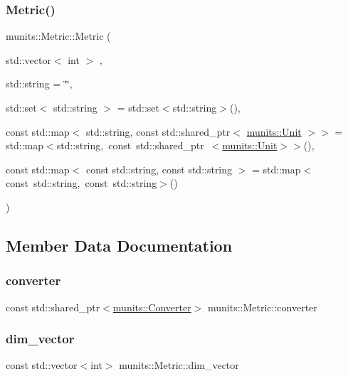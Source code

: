 \subsubsection{\texorpdfstring{Metric()}{Metric()}}
{\footnotesize\ttfamily munits\+::\+Metric\+::\+Metric (\begin{DoxyParamCaption}\item[{std\+::vector$<$ int $>$}]{,  }\item[{std\+::string}]{ = {\ttfamily \char`\"{}\char`\"{}},  }\item[{std\+::set$<$ std\+::string $>$}]{ = {\ttfamily std\+:\+:set$<$std\+:\+:string$>$()},  }\item[{const std\+::map$<$ std\+::string, const std\+::shared\+\_\+ptr$<$ \hyperlink{classmunits_1_1_unit}{munits\+::\+Unit} $>$$>$}]{ = {\ttfamily std\+:\+:map$<$std\+:\+:string,~const~std\+:\+:shared\+\_\+ptr~$<$\hyperlink{classmunits_1_1_unit}{munits\+::\+Unit}$>$$>$()},  }\item[{const std\+::map$<$ const std\+::string, const std\+::string $>$}]{ = {\ttfamily std\+:\+:map$<$const~std\+:\+:string,~const~std\+:\+:string$>$()} }\end{DoxyParamCaption})}



\subsection{Member Data Documentation}
\mbox{\label{structmunits_1_1_metric_aa51faca2f90c8bc80a8c5144a1ce15a0}} 
\subsubsection{\texorpdfstring{converter}{converter}}
{\footnotesize\ttfamily const std\+::shared\+\_\+ptr$<$\hyperlink{classmunits_1_1_converter}{munits\+::\+Converter}$>$ munits\+::\+Metric\+::converter}

\mbox{\label{structmunits_1_1_metric_a4beffad44091db5d1173075b5130266d}} 
\subsubsection{\texorpdfstring{dim\+\_\+vector}{dim\_vector}}
{\footnotesize\ttfamily const std\+::vector$<$int$>$ munits\+::\+Metric\+::dim\+\_\+vector}

